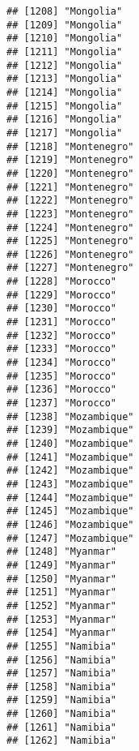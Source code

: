 \documentclass[]{article}
\begin{document}
\begin{verbatim}
## [1208] "Mongolia"                           
## [1209] "Mongolia"                           
## [1210] "Mongolia"                           
## [1211] "Mongolia"                           
## [1212] "Mongolia"                           
## [1213] "Mongolia"                           
## [1214] "Mongolia"                           
## [1215] "Mongolia"                           
## [1216] "Mongolia"                           
## [1217] "Mongolia"                           
## [1218] "Montenegro"                         
## [1219] "Montenegro"                         
## [1220] "Montenegro"                         
## [1221] "Montenegro"                         
## [1222] "Montenegro"                         
## [1223] "Montenegro"                         
## [1224] "Montenegro"                         
## [1225] "Montenegro"                         
## [1226] "Montenegro"                         
## [1227] "Montenegro"                         
## [1228] "Morocco"                            
## [1229] "Morocco"                            
## [1230] "Morocco"                            
## [1231] "Morocco"                            
## [1232] "Morocco"                            
## [1233] "Morocco"                            
## [1234] "Morocco"                            
## [1235] "Morocco"                            
## [1236] "Morocco"                            
## [1237] "Morocco"                            
## [1238] "Mozambique"                         
## [1239] "Mozambique"                         
## [1240] "Mozambique"                         
## [1241] "Mozambique"                         
## [1242] "Mozambique"                         
## [1243] "Mozambique"                         
## [1244] "Mozambique"                         
## [1245] "Mozambique"                         
## [1246] "Mozambique"                         
## [1247] "Mozambique"                         
## [1248] "Myanmar"                            
## [1249] "Myanmar"                            
## [1250] "Myanmar"                            
## [1251] "Myanmar"                            
## [1252] "Myanmar"                            
## [1253] "Myanmar"                            
## [1254] "Myanmar"                            
## [1255] "Namibia"                            
## [1256] "Namibia"                            
## [1257] "Namibia"                            
## [1258] "Namibia"                            
## [1259] "Namibia"                            
## [1260] "Namibia"                            
## [1261] "Namibia"                            
## [1262] "Namibia"                            

\end{verbatim}
\end{document}
